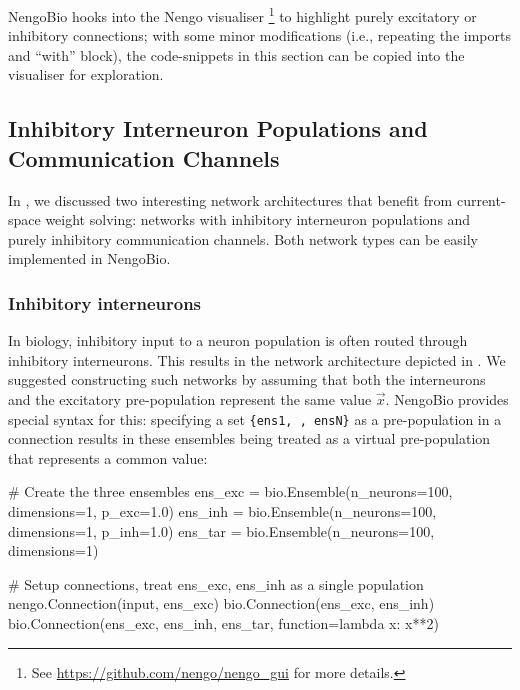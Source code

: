 NengoBio hooks into the Nengo \GUI visualiser%
\footnote{See \url{https://github.com/nengo/nengo_gui} for more details.}
to highlight purely excitatory or inhibitory connections; with some minor modifications (i.e., repeating the imports and \enquote{with} block), the code-snippets in this section can be copied into the visualiser for exploration.

\subsection{Inhibitory Interneuron Populations and Communication Channels}
\label{sec:nengo_bio_inhibitory}

In , we discussed two interesting network architectures that benefit from current-space weight solving: networks with inhibitory interneuron populations and purely inhibitory communication channels.
Both network types can be easily implemented in NengoBio.

\subsubsection{Inhibitory interneurons}
In biology, inhibitory input to a neuron population is often routed through inhibitory interneurons.
This results in the network architecture depicted in .
We suggested constructing such networks by assuming that both the interneurons and the excitatory pre-population represent the same value $\vec x$.
NengoBio provides special syntax for this: specifying a set \texttt{\{ens1, \textellipsis, ensN\}} as a pre-population in a connection results in these ensembles being treated as a virtual pre-population that represents a common value:
\begin{pythoncode}
# Create the three ensembles
ens_exc = bio.Ensemble(n_neurons=100, dimensions=1, p_exc=1.0)
ens_inh = bio.Ensemble(n_neurons=100, dimensions=1, p_inh=1.0)
ens_tar = bio.Ensemble(n_neurons=100, dimensions=1)

# Setup connections, treat {ens_exc, ens_inh} as a single population
nengo.Connection(input, ens_exc)
bio.Connection(ens_exc, ens_inh)
bio.Connection({ens_exc, ens_inh}, ens_tar, function=lambda x: x**2)
\end{pythoncode}

